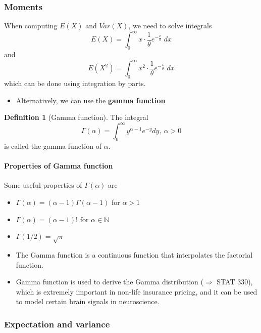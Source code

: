 \documentclass[
]{book}
\providecommand{\tightlist}{%
  \setlength{\itemsep}{0pt}\setlength{\parskip}{0pt}}
\theoremstyle{definition}
\newtheorem{definition}{Definition}[chapter]
\theoremstyle{definition}
\theoremstyle{definition}
\theoremstyle{definition}
\theoremstyle{remark}
\begin{document}
\subsubsection{Moments}\label{moments}

When computing \(E(X)\) and \(Var(X)\), we need to solve integrals
\[ E(X) = \int_0^\infty x\cdot \frac{1}{\theta} e^{-\frac{x}{\theta}}\;d x\]
and
\[ E(X^2) = \int_0^\infty x^2 \cdot \frac{1}{\theta} e^{-\frac{x}{\theta}}\;d x\]
which can be done using integration by parts.

\begin{itemize}
\tightlist
\item
  Alternatively, we can use the \textbf{gamma function}
\end{itemize}

\begin{definition}[Gamma function]
The integral
\[
        \Gamma(\alpha) = \int_0^\infty y^{\alpha - 1} e^{-y} dy, \ \alpha > 0
        \]
is called the gamma function of \(\alpha\).
\end{definition}

\paragraph{Properties of Gamma function}\label{properties-of-gamma-function}

Some useful properties of \(\Gamma(\alpha)\) are

\begin{itemize}
\tightlist
\item
  \(\Gamma(\alpha) = (\alpha - 1)\Gamma(\alpha - 1)\) for \(\alpha > 1\)
\item
  \(\Gamma(\alpha) = (\alpha - 1)!\) for \(\alpha \in \mathbb{N}\)
\item
  \(\Gamma(1/2) = \sqrt{\pi}\)
\item
  The Gamma function is a continuous function that interpolates the factorial function.
\item
  Gamma function is used to derive the Gamma distribution (\(\Rightarrow\) STAT 330), which is extremely important in non-life insurance pricing, and it can be used to model certain brain signals in neuroscience.
\end{itemize}

\subsubsection{Expectation and variance}\label{expectation-and-variance-1}
\end{document}

